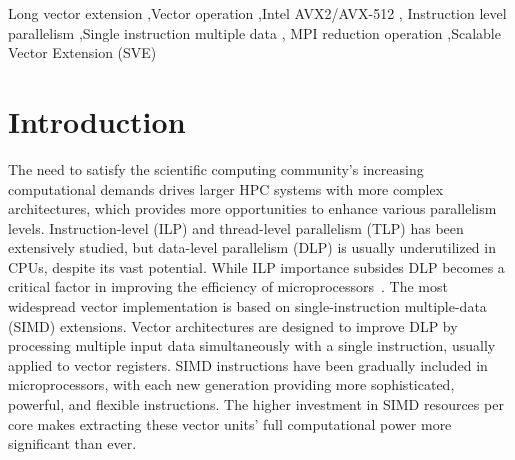 \documentclass[5p,times,twocolumn]{elsarticle}
\begin{document}
\begin{abstract}
%
\end{abstract}

\begin{keyword}
Long vector extension \sep Vector operation \sep Intel AVX2/AVX-512 \sep
Instruction level parallelism \sep Single instruction multiple data \sep
MPI reduction operation \sep Scalable Vector Extension (SVE)
\end{keyword}

\maketitle

\section{Introduction}\label{sec:intro}
The need to satisfy the scientific computing community's increasing
computational demands drives larger HPC systems with more complex architectures,
which provides more opportunities to enhance various parallelism levels.
%
Instruction-level (ILP) and thread-level parallelism (TLP) has been extensively
studied, but data-level parallelism (DLP) is usually underutilized in CPUs, despite its vast potential.
While ILP importance subsides DLP becomes a critical
factor in improving the efficiency of
microprocessors~\cite{energyeffects, HardwareEvents, espasa1998vector, Watson1972TheTA, clusterefficiency}.
The most widespread vector implementation is based on single-instruction multiple-data (SIMD) extensions.
Vector architectures are designed to improve DLP by processing multiple input data simultaneously with a single instruction, usually applied to vector registers.
SIMD instructions have been gradually included in
microprocessors, with each new generation providing more sophisticated, powerful, and flexible
instructions. The higher investment in SIMD resources per core makes extracting
these vector units' full computational power more significant than ever.
\end{document}
